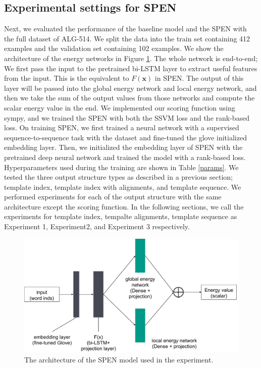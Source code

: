 \documentclass[11pt,letterpaper]{article}
\begin{document}
\subsection{Experimental settings for SPEN}
Next, we evaluated the performance of the baseline model and the SPEN with the full dataset of ALG-514. We split the data into the train set containing 412 examples and the validation set containing 102 examples. We show the architecture of the energy networks in Figure \ref{spen-architecture}. The whole network is end-to-end; We first pass the input to the pretrained bi-LSTM layer to extract useful features from the input. This is the equivalent to $F(\mathbf{x})$ in SPEN. The output of this layer will be passed into the global energy network and local energy network, and then we take the sum of the output values from those networks and compute the scalar energy value in the end. We implemented our scoring function using sympy, and we trained the SPEN with both the SSVM loss and the rank-based loss. On training SPEN, we first trained a neural network with a supervised sequence-to-sequence task with the dataset and fine-tuned the glove initialized embedding layer. Then, we initialized the embedding layer of SPEN with the pretrained deep neural network and trained the model with a rank-based loss. Hyperparameters used during the training are shown in Table \ref{params}. We tested the three output structure types as described in a previous section; template index, template index with alignments, and template sequence. We performed experiments for each of the output structure with the same architecture except the scoring function. In the following sections, we call the experiments for template index, tempalte alignments, template sequence as Experiment 1, Experiment2, and Experiment 3 respectively.
\begin{figure}[ht]
	\centering
	\includegraphics[bb=0 0 609 324, scale=0.35]{spen_architecture.pdf}
    \caption{The architecture of the SPEN model used in the experiment.}
    \label{spen-architecture}
\end{figure}
\end{document}
